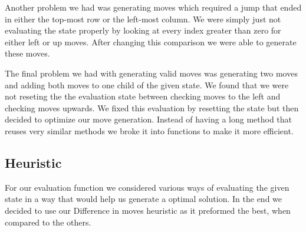 \documentclass[12pt]{article}
\begin{document}
Another problem we had was generating moves which required a jump that ended in either the top-most row or the left-most column.
We were simply just not evaluating the state properly by looking at every index greater than zero for either left or up moves.
After changing this comparison we were able to generate these moves.
 
The final problem we had with generating valid moves was generating two moves and adding both moves to one child of the given state.
We found that we were not reseting the the evaluation state between checking moves to the left and checking moves upwards.
We fixed this evaluation by resetting the state but then decided to optimize our move generation.
Instead of having a long method that reuses very similar methods we broke it into functions to make it more efficient.

\subsection*{Heuristic}
For our evaluation function we considered various ways of evaluating the given state in a way that would help us generate a optimal solution.
In the end we decided to use our Difference in moves heuristic as it preformed the best, when compared to the others.
\end{document}
